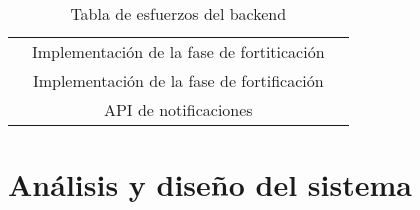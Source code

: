 \documentclass[11pt, a4paper, titlepage]{article}
\begin{document}
\begin{landscape}
\begin{table}[hbt!]
\begin{tabular}{c|cc|c|}
\multicolumn{1}{|c|}{}                             & \multicolumn{2}{c|}{Implementación de la fase de fortiticación}                                                                                                                                                                                                                                                                   &                                     \\ \cline{2-3}
\multicolumn{1}{|c|}{}                             & \multicolumn{2}{c|}{Implementación de la fase de fortificación}                                                                                                                                                                                                                                                                   &                                     \\ \cline{2-3}
\multicolumn{1}{|c|}{}                             & \multicolumn{2}{c|}{API de notificaciones}                                                                                                                                                                                                                                                                                        &                                     \\ \hline
\end{tabular}
\caption{Tabla de esfuerzos del backend}
\label{table:backend}
\end{table}
\end{landscape}
\FloatBarrier

\section{Análisis y diseño del sistema}
\end{document}
